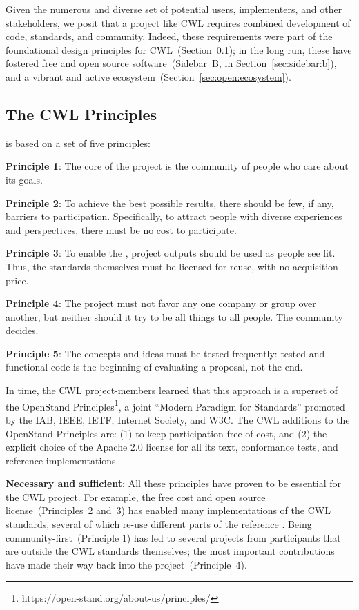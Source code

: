 \documentclass[sigconf,authordraft]{acmart}
\begin{document}
Given the numerous and diverse set of potential users, implementers, and other stakeholders, we posit that a project like CWL requires  combined development of code, standards, and community. Indeed, these requirements were part of the foundational design principles for CWL~(Section~\ref{sec:open:principles}); in the long run, these have fostered free and open source software~(Sidebar~B, in Section~\ref{sec:sidebar:b}), and a vibrant and active ecosystem~(Section~\ref{sec:open:ecosystem}). 


\subsection{The CWL Principles} \label{sec:open:principles}

 is based on a set of five principles:

\textbf{Principle 1}: The core of the project is the community of people who care about its goals.

\textbf{Principle 2}: To achieve the best possible results, there should be few, if any, barriers to participation. Specifically, to attract people with diverse experiences and perspectives, there must be no cost to participate.

\textbf{Principle 3}: To enable the , project outputs should be used as people see fit. Thus, the standards themselves must be licensed for reuse, with no acquisition price.

\textbf{Principle 4}: The project must not favor any one company or group over another, but neither should it try to be all things to all people. The community decides.

\textbf{Principle 5}: The concepts and ideas must be tested frequently: tested and functional code is the beginning of evaluating a proposal, not the end.

In time, the CWL project-members learned that this approach is a superset of the OpenStand Principles\footnote{https://open-stand.org/about-us/principles/}, a joint ``Modern Paradigm for Standards'' promoted by the IAB, IEEE, IETF, Internet Society, and W3C. The CWL  additions to the OpenStand Principles are: (1) to keep participation free of cost, and (2) the explicit choice of the Apache 2.0 license for all its text, conformance tests, and reference implementations.

\textbf{Necessary and sufficient}: All these principles have proven to be essential for the CWL project. For example, the free cost and open source license~(Principles~2 and~3) has enabled many implementations of the CWL standards, several of which re-use different parts of the reference . Being community-first~(Principle 1) has led to several projects from participants that are outside the CWL standards themselves; the most important contributions have made their way back into the project~(Principle~4).
\end{document}
